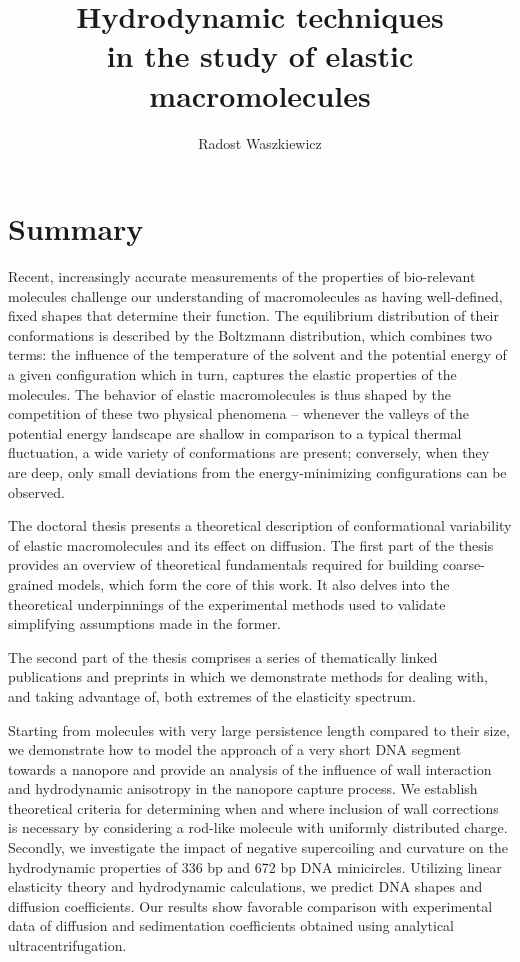 \documentclass{doctoral}
\title{Hydrodynamic techniques\\in the study of elastic macromolecules}
\author{Radost Waszkiewicz}
\affiliation{University of Warsaw\\Faculty of Physics}
\begin{document}
\maketitle
{}

\section*{Summary}

Recent, increasingly accurate measurements of the properties of bio-relevant molecules challenge our understanding of macromolecules as having well-defined, fixed shapes that determine their function.
The equilibrium distribution of their conformations is described by the Boltzmann distribution, which combines two terms: the influence of the temperature of the solvent and the potential energy of a given configuration which in turn, captures the elastic properties of the molecules.
The behavior of elastic macromolecules is thus shaped by the competition of these two physical phenomena -- whenever the valleys of the potential energy landscape are shallow in comparison to a typical thermal fluctuation, a wide variety of conformations are present; conversely, when they are deep, only small deviations from the energy-minimizing configurations can be observed.

The doctoral thesis presents a theoretical description of conformational variability of elastic macromolecules and its effect on diffusion.
The first part of the thesis provides an overview of theoretical fundamentals required for building coarse-grained models, which form the core of this work.
It also delves into the theoretical underpinnings of the experimental methods used to validate simplifying assumptions made in the former.

The second part of the thesis comprises a series of thematically linked publications and preprints in which we demonstrate methods for dealing with, and taking advantage of, both extremes of the elasticity spectrum.

Starting from molecules with very large persistence length compared to their size, we demonstrate how to model the approach of a very short DNA segment towards a nanopore and provide an analysis of the influence of wall interaction and hydrodynamic anisotropy in the nanopore capture process.
We establish theoretical criteria for determining when and where inclusion of wall corrections is necessary by considering a rod-like molecule with uniformly distributed charge.
Secondly, we investigate the impact of negative supercoiling and curvature on the hydrodynamic properties of 336 bp and 672 bp DNA minicircles.
Utilizing linear elasticity theory and hydrodynamic calculations, we predict DNA shapes and diffusion coefficients.
Our results show favorable comparison with experimental data of diffusion and sedimentation coefficients obtained using analytical ultracentrifugation.
\end{document}
